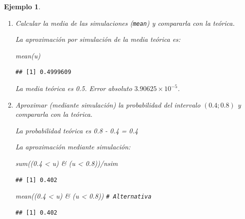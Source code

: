 \documentclass[
]{book}
\newenvironment{Shaded}{\begin{snugshade}}{\end{snugshade}}
\newcommand{\CommentTok}[1]{\textcolor[rgb]{0.56,0.35,0.01}{\textit{#1}}}
\newcommand{\FloatTok}[1]{\textcolor[rgb]{0.00,0.00,0.81}{#1}}
\newcommand{\FunctionTok}[1]{\textcolor[rgb]{0.00,0.00,0.00}{#1}}
\newcommand{\NormalTok}[1]{#1}
\newcommand{\SpecialCharTok}[1]{\textcolor[rgb]{0.00,0.00,0.00}{#1}}
\theoremstyle{break}
\newtheorem{example}{Ejemplo}[chapter]
\theoremstyle{nonumberplain}
\renewcommand{\CommentTok}[1]{\textcolor[rgb]{0.41,0.41,0.41}{\texttt{#1}}}
\begin{document}
\begin{example}
\begin{enumerate}
  \begin{figure}[!htb]

  {\centering \texttt{[image: 02-Generacion\_numeros\_aleatorios\_files/figure-latex/ejcona-1]} 

  }

  \caption{Histograma de los valores generados.}\label{fig:ejcona}
  \end{figure}

  En este caso concreto la distribución de los valores generados es aparentemente más uniforme de lo que cabría esperar, lo que induciría a sospechar de la calidad de este generador (ver Ejemplo \ref{exm:congru512b} en Sección \ref{calgen}).
\item
  Calcular la media de las simulaciones (\texttt{mean}) y compararla con
  la teórica.

  La aproximación por simulación de la media teórica es:

\begin{Shaded}
\begin{Highlighting}[]
\FunctionTok{mean}\NormalTok{(u)}
\end{Highlighting}
\end{Shaded}

\begin{verbatim}
## [1] 0.4999609
\end{verbatim}

  La media teórica es 0.5.
  Error absoluto \(\ensuremath{3.90625\times 10^{-5}}\).
\item
  Aproximar (mediante simulación) la probabilidad del intervalo
  \((0.4;0.8)\) y compararla con la teórica.

  La probabilidad teórica es 0.8 - 0.4 = 0.4

  La aproximación mediante simulación:

\begin{Shaded}
\begin{Highlighting}[]
\FunctionTok{sum}\NormalTok{((}\FloatTok{0.4} \SpecialCharTok{\textless{}}\NormalTok{ u) }\SpecialCharTok{\&}\NormalTok{ (u }\SpecialCharTok{\textless{}} \FloatTok{0.8}\NormalTok{))}\SpecialCharTok{/}\NormalTok{nsim}
\end{Highlighting}
\end{Shaded}

\begin{verbatim}
## [1] 0.402
\end{verbatim}

\begin{Shaded}
\begin{Highlighting}[]
\FunctionTok{mean}\NormalTok{((}\FloatTok{0.4} \SpecialCharTok{\textless{}}\NormalTok{ u) }\SpecialCharTok{\&}\NormalTok{ (u }\SpecialCharTok{\textless{}} \FloatTok{0.8}\NormalTok{))     }\CommentTok{\# Alternativa}
\end{Highlighting}
\end{Shaded}

\begin{verbatim}
## [1] 0.402
\end{verbatim}
\end{enumerate}

\end{example}
\end{document}

